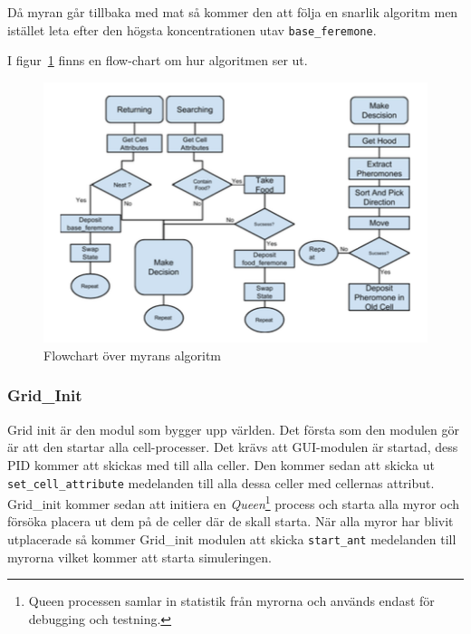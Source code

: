 \documentclass[12pt]{article}
\begin{document}
Då myran går tillbaka med mat så kommer den att följa en snarlik algoritm men istället leta efter den högsta koncentrationen utav \texttt{base\_feremone}.

I figur~\ref{fig:ant-algorithm} finns en flow-chart om hur algoritmen ser ut.


\begin{figure}
    \centering
    \includegraphics[width=\textwidth]{BugsLife-Fig3.png}
    \caption{Flowchart över myrans algoritm}
    \label{fig:ant-algorithm}
\end{figure}

\subsubsection{Grid\_Init}
Grid init är den modul som bygger upp världen.
Det första som den modulen gör är att den startar alla cell-processer.
Det krävs att GUI-modulen är startad,
dess PID kommer att skickas med till alla celler.
Den kommer sedan att skicka ut \texttt{set\_cell\_attribute} medelanden till alla dessa celler med cellernas attribut.
Grid\_init kommer sedan att initiera en \textit{Queen}\footnote{Queen processen samlar in statistik från myrorna och används endast för debugging och testning.} process och starta alla myror och försöka placera ut dem på de celler där de skall starta.
När alla myror har blivit utplacerade så kommer Grid\_init modulen att skicka \texttt{start\_ant} medelanden till myrorna vilket kommer att starta simuleringen.
\end{document}
